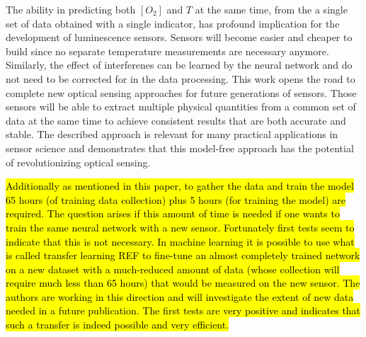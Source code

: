 \documentclass[final,5p,times,twocolumn]{elsarticle}
\begin{document}
The ability  in predicting both $[O_2]$ and $T$ at the same time, from the a single set of data obtained with a single indicator, has profound implication for the development of luminescence sensors. Sensors will become easier and cheaper to build since no separate temperature measurements are necessary anymore. Similarly, the effect of interferenes can be learned by the neural network and do not need to be corrected for in the data processing.
This work opens the road to complete new optical sensing approaches for future generations of sensors. Those sensors will be able to extract multiple physical quantities from a common set of data at the same time to achieve consistent results that are both accurate and stable. The described approach is relevant for many practical applications in sensor science and demonstrates that this model-free approach has the potential of revolutionizing optical sensing.

\hl{Additionally as mentioned in this paper, to gather the data and train the model 65 hours (of training data collection) plus 5 hours (for training the model) are required. The question arises if this amount of time is needed if one wants to train the same neural network with a new sensor. Fortunately first tests seem to indicate that this is not necessary. In machine learning it is possible to use what is called transfer learning REF to fine-tune an almost completely trained network on a new dataset with a much-reduced amount of data  (whose collection will require much less than 65 hours) that would be measured on the new sensor.
The authors are working in this direction and will investigate the extent of new data needed in a future publication. The first tests are very positive and indicates that such a transfer is indeed possible and very efficient.
} \cite{transfer}






\medskip
\end{document}
